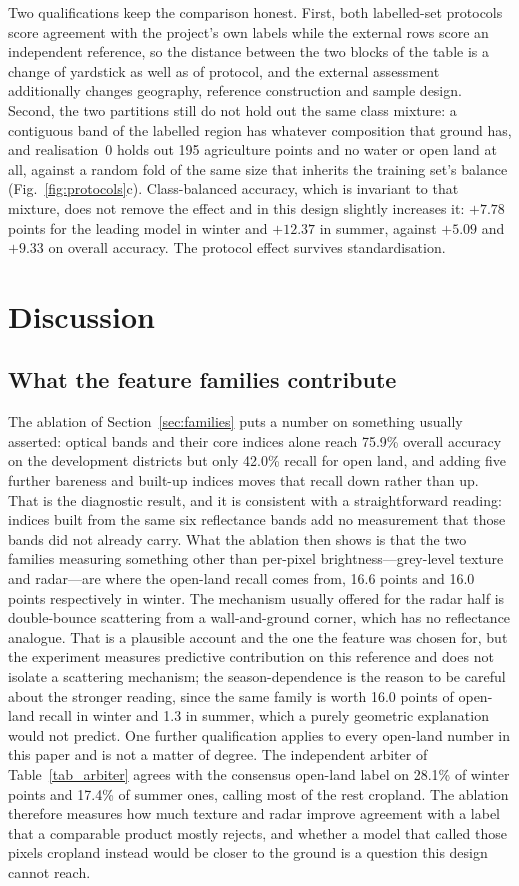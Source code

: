 \documentclass[conference]{IEEEtran}
\begin{document}
Two qualifications keep the comparison honest. First, both labelled-set protocols score agreement with the project's own labels while the external rows score an independent reference, so the distance between the two blocks of the table is a change of yardstick as well as of protocol, and the external assessment additionally changes geography, reference construction and sample design. Second, the two partitions still do not hold out the same class mixture: a contiguous band of the labelled region has whatever composition that ground has, and realisation~0 holds out 195 agriculture points and no water or open land at all, against a random fold of the same size that inherits the training set's balance (Fig.~\ref{fig:protocols}c). Class-balanced accuracy, which is invariant to that mixture, does not remove the effect and in this design slightly increases it: $+7.78$ points for the leading model in winter and $+12.37$ in summer, against $+5.09$ and $+9.33$ on overall accuracy. The protocol effect survives standardisation.

\section{Discussion}

\subsection{What the feature families contribute}
The ablation of Section~\ref{sec:families} puts a number on something usually asserted: optical bands and their core indices alone reach 75.9\% overall accuracy on the development districts but only 42.0\% recall for open land, and adding five further bareness and built-up indices moves that recall down rather than up. That is the diagnostic result, and it is consistent with a straightforward reading: indices built from the same six reflectance bands add no measurement that those bands did not already carry. What the ablation then shows is that the two families measuring something other than per-pixel brightness---grey-level texture and radar---are where the open-land recall comes from, 16.6 points and 16.0 points respectively in winter. The mechanism usually offered for the radar half is double-bounce scattering from a wall-and-ground corner, which has no reflectance analogue. That is a plausible account and the one the feature was chosen for, but the experiment measures predictive contribution on this reference and does not isolate a scattering mechanism; the season-dependence is the reason to be careful about the stronger reading, since the same family is worth 16.0 points of open-land recall in winter and 1.3 in summer, which a purely geometric explanation would not predict. One further qualification applies to every open-land number in this paper and is not a matter of degree. The independent arbiter of Table~\ref{tab_arbiter} agrees with the consensus open-land label on 28.1\% of winter points and 17.4\% of summer ones, calling most of the rest cropland. The ablation therefore measures how much texture and radar improve agreement with a label that a comparable product mostly rejects, and whether a model that called those pixels cropland instead would be closer to the ground is a question this design cannot reach. 
\end{document}
